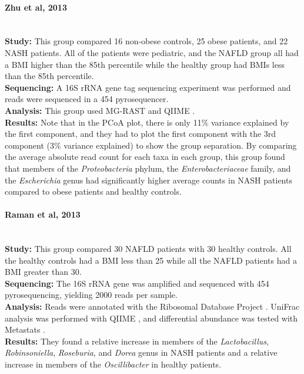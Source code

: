 \paragraph{Zhu et al, 2013 \cite{zhu2013characterization}}\mbox{}\\
\textbf{Study:} This group compared 16 non-obese controls, 25 obese patients, and 22 NASH patients. All of the patients were pediatric, and the NAFLD group all had a BMI higher than the 85th percentile while the healthy group had BMIs less than the 85th percentile.\\
\textbf{Sequencing:} A 16S rRNA gene tag sequencing experiment was performed and reads were sequenced in a 454 pyrosequencer.\\
\textbf{Analysis:} This group used MG-RAST \cite{meyer2008metagenomics} and QIIME \cite{caporaso2010qiime}.\\
\textbf{Results:} Note that in the PCoA plot, there is only 11\% variance explained by the first component, and they had to plot the first component with the 3rd component (3\% variance explained) to show the group separation. By comparing the average absolute read count for each taxa in each group, this group found that members of the \textit{Proteobacteria} phylum, the \textit{Enterobacteriaceae} family, and the \textit{Escherichia} genus had significantly higher average counts in NASH patients compared to obese patients and healthy controls.

\paragraph{Raman et al, 2013 \cite{raman2013fecal}}\mbox{}\\
\textbf{Study:} This group compared 30 NAFLD patients with 30 healthy controls. All the healthy controls had a BMI less than 25 while all the NAFLD patients had a BMI greater than 30.\\
\textbf{Sequencing:} The 16S rRNA gene was amplified and sequenced with 454 pyrosequencing, yielding 2000 reads per sample.\\
\textbf{Analysis:} Reads were annotated with the Ribosomal Database Project \cite{cole2009ribosomal}. UniFrac analysis was performed with QIIME \cite{caporaso2010qiime}, and differential abundance was tested with Metastats \cite{paulson2011metastats}.\\
\textbf{Results:} They found a relative increase in members of the \textit{Lactobacillus}, \textit{Robinsoniella}, \textit{Roseburia}, and \textit{Dorea} genus in NASH patients and a relative increase in members of the \textit{Oscillibacter} in healthy patients.

